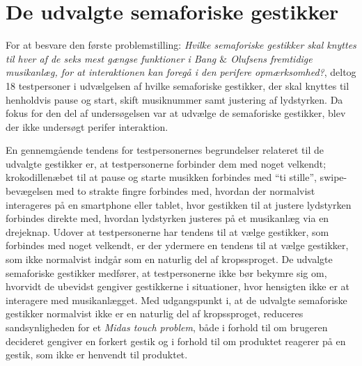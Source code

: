 \section{De udvalgte semaforiske gestikker}
\label{DiskussionUdvalgteGestikker}
%
For at besvare den første problemstilling: \textit{Hvilke semaforiske gestikker skal knyttes til hver af de seks mest gængse funktioner i Bang $\&$ Olufsens fremtidige musikanlæg, for at interaktionen kan foregå i den perifere opmærksomhed?}, deltog 18 testpersoner i udvælgelsen af hvilke semaforiske gestikker, der skal knyttes til henholdvis pause og start, skift musiknummer samt justering af lydstyrken. Da fokus for den del af undersøgelsen var at udvælge de semaforiske gestikker, blev der ikke undersøgt perifer interaktion. 

En gennemgående tendens for testpersonernes begrundelser relateret til de udvalgte gestikker er, at testpersonerne forbinder dem med noget velkendt; krokodillenæbet til at pause og starte musikken forbindes med \enquote{ti stille}, swipe-bevægelsen med to strakte fingre forbindes med, hvordan der normalvist interageres på en smartphone eller tablet, hvor gestikken til at justere lydstyrken forbindes direkte med, hvordan lydstyrken justeres på et musikanlæg via en drejeknap. Udover at testpersonerne har tendens til at vælge gestikker, som forbindes med noget velkendt, er der ydermere en tendens til at vælge gestikker, som ikke normalvist indgår som en naturlig del af kropssproget. De udvalgte semaforiske gestikker medfører, at testpersonerne ikke bør bekymre sig om, hvorvidt de ubevidst gengiver gestikkerne i situationer, hvor hensigten ikke er at interagere med musikanlægget. Med udgangspunkt i, at de udvalgte semaforiske gestikker normalvist ikke er en naturlig del af kropssproget, reduceres sandsynligheden for et \textit{Midas touch problem}, både i forhold til om brugeren decideret gengiver en forkert gestik og i forhold til om produktet reagerer på en gestik, som ikke er henvendt til produktet. 

